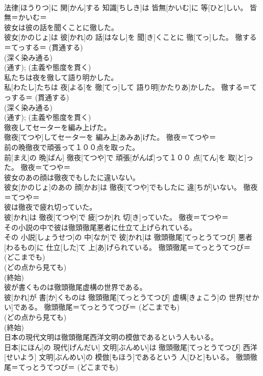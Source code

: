 \documentclass[8pt]{extreport}
\begin{document}
\begin{CJK}{UTF8}{min}
{\\	法律[ほうりつ]に 関[かん]する 知識[ちしき]は 皆無[かいむ]に 等[ひと]しい。	皆無＝かいむ＝ 
\\	彼女は彼の話を聞くことに徹した。	
\\	彼女[かのじょ]は 彼[かれ]の 話[はなし]を 聞[き]くことに 徹[てっ]した。	徹する＝てっする＝ (貫通する) 
\\	(深く染み通る) 
\\	(通す); (主義や態度を貫く) 
\\	私たちは夜を徹して語り明かした。	
\\	私[わたし]たちは 夜[よる]を 徹[てっ]して 語り明[かたりあ]かした。	徹する＝てっする＝ (貫通する) 
\\	(深く染み通る) 
\\	(通す); (主義や態度を貫く) 
\\	徹夜してセーターを編み上げた。	
\\	徹夜[てつや]してセーターを 編み上[あみあ]げた。	徹夜＝てつや＝ 
\\	前の晩徹夜で頑張って１００点を取った。	
\\	前[まえ]の 晩[ばん] 徹夜[てつや]で 頑張[がんば]って１００ 点[てん]を 取[と]った。	徹夜＝てつや＝ 
\\	彼女のあの顔は徹夜でもしたに違いない。	
\\	彼女[かのじょ]のあの 顔[かお]は 徹夜[てつや]でもしたに 違[ちが]いない。	徹夜＝てつや＝ 
\\	彼は徹夜で疲れ切っていた。	
\\	彼[かれ]は 徹夜[てつや]で 疲[つか]れ 切[き]っていた。	徹夜＝てつや＝ 
\\	その小説の中で彼は徹頭徹尾悪者に仕立て上げられている。	
\\	その 小説[しょうせつ]の 中[なか]で 彼[かれ]は 徹頭徹尾[てっとうてつび] 悪者[わるもの]に 仕立[した]て 上[あ]げられている。	徹頭徹尾＝てっとうてつび＝ (どこまでも) 
\\	(どの点から見ても) 
\\	(終始) 
\\	彼が書くものは徹頭徹尾虚構の世界である。	
\\	彼[かれ]が 書[か]くものは 徹頭徹尾[てっとうてつび] 虚構[きょこう]の 世界[せかい]である。	徹頭徹尾＝てっとうてつび＝ (どこまでも) 
\\	(どの点から見ても) 
\\	(終始) 
\\	日本の現代文明は徹頭徹尾西洋文明の模倣であるという人もいる。	
\\	日本[にほん]の 現代[げんだい] 文明[ぶんめい]は 徹頭徹尾[てっとうてつび] 西洋[せいよう] 文明[ぶんめい]の 模倣[もほう]であるという 人[ひと]もいる。	徹頭徹尾＝てっとうてつび＝ (どこまでも) 
}
\end{CJK}
\end{document}
